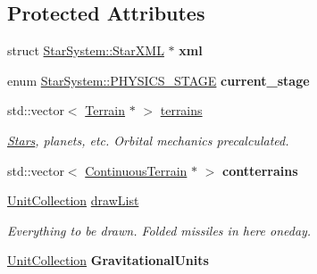 \subsection*{Protected Attributes}
\begin{DoxyCompactItemize}
\item 
struct \hyperlink{structStarSystem_1_1StarXML}{Star\+System\+::\+Star\+X\+ML} $\ast$ {\bfseries xml}\hypertarget{classStarSystem_a5711b39908dfcf288e47e585a43a155e}{}\label{classStarSystem_a5711b39908dfcf288e47e585a43a155e}

\item 
enum \hyperlink{classStarSystem_ae8d7d6862b3d9218cb82894352895aa7}{Star\+System\+::\+P\+H\+Y\+S\+I\+C\+S\+\_\+\+S\+T\+A\+GE} {\bfseries current\+\_\+stage}\hypertarget{classStarSystem_a4f4a7b46cc625a312c291c414e3746bf}{}\label{classStarSystem_a4f4a7b46cc625a312c291c414e3746bf}

\item 
std\+::vector$<$ \hyperlink{classTerrain}{Terrain} $\ast$ $>$ \hyperlink{classStarSystem_a33cc71baef9da21e8cf6efb451ef17fc}{terrains}\hypertarget{classStarSystem_a33cc71baef9da21e8cf6efb451ef17fc}{}\label{classStarSystem_a33cc71baef9da21e8cf6efb451ef17fc}

\begin{DoxyCompactList}\small\item\em \hyperlink{classStars}{Stars}, planets, etc. Orbital mechanics precalculated. \end{DoxyCompactList}\item 
std\+::vector$<$ \hyperlink{classContinuousTerrain}{Continuous\+Terrain} $\ast$ $>$ {\bfseries contterrains}\hypertarget{classStarSystem_a89f1f82328d6eaab7bd22146377aacfc}{}\label{classStarSystem_a89f1f82328d6eaab7bd22146377aacfc}

\item 
\hyperlink{classUnitCollection}{Unit\+Collection} \hyperlink{classStarSystem_a3f20918c69dee3b4758bb4a356d9a2ca}{draw\+List}\hypertarget{classStarSystem_a3f20918c69dee3b4758bb4a356d9a2ca}{}\label{classStarSystem_a3f20918c69dee3b4758bb4a356d9a2ca}

\begin{DoxyCompactList}\small\item\em Everything to be drawn. Folded missiles in here oneday. \end{DoxyCompactList}\item 
\hyperlink{classUnitCollection}{Unit\+Collection} {\bfseries Gravitational\+Units}\hypertarget{classStarSystem_aa7613fe8f5db2c40bd06dbdd23fd0f00}{}\label{classStarSystem_aa7613fe8f5db2c40bd06dbdd23fd0f00}


\end{DoxyCompactItemize}
